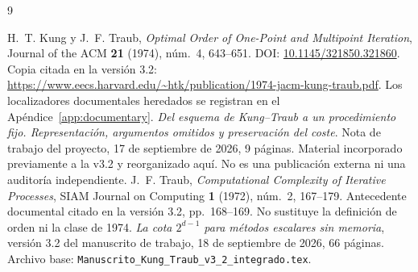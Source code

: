 \documentclass[11pt,a4paper]{article}
\numberwithin{equation}{section}
\theoremstyle{definition}
\theoremstyle{remark}
\begin{document}
\clearpage
\begin{thebibliography}{9}
H.~T. Kung y J.~F. Traub,
\emph{Optimal Order of One-Point and Multipoint Iteration},
Journal of the ACM \textbf{21} (1974), núm.~4, 643--651.
DOI: \href{https://doi.org/10.1145/321850.321860}{10.1145/321850.321860}.
Copia citada en la versión 3.2:
\url{https://www.eecs.harvard.edu/~htk/publication/1974-jacm-kung-traub.pdf}.
Los localizadores documentales heredados se registran en el Apéndice~\ref{app:documentary}.
\emph{Del esquema de Kung--Traub a un procedimiento fijo. Representación, argumentos omitidos y preservación del coste}.
Nota de trabajo del proyecto, 17 de septiembre de 2026, 9 páginas. Material incorporado previamente a la v3.2 y reorganizado aquí. No es una publicación externa ni una auditoría independiente.
J.~F. Traub,
\emph{Computational Complexity of Iterative Processes},
SIAM Journal on Computing \textbf{1} (1972), núm.~2, 167--179.
Antecedente documental citado en la versión 3.2, pp.~168--169. No sustituye la definición de orden ni la clase de 1974.
\emph{La cota $2^{d-1}$ para métodos escalares sin memoria}, versión 3.2 del manuscrito de trabajo, 18 de septiembre de 2026, 66 páginas.
Archivo base: \texttt{Manuscrito\_Kung\_Traub\_v3\_2\_integrado.tex}.
\end{thebibliography}
\end{document}
